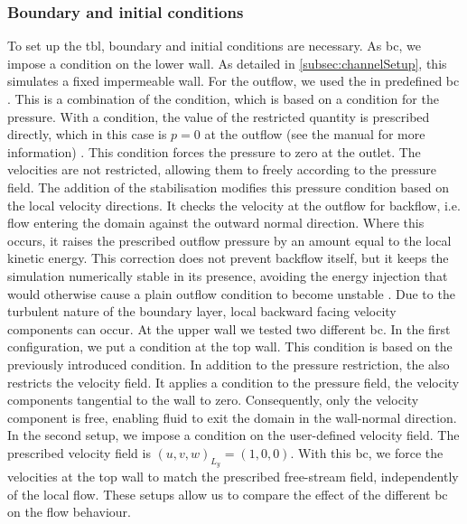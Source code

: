 \subsubsection{Boundary and initial conditions} 

To set up the \acrshort{tbl}, boundary and initial conditions are necessary. 
As \acrshort{bc}, we impose a  condition on the lower wall.
As detailed in \autoref{subsec:channelSetup}, this simulates a fixed impermeable wall.
For the outflow, we used the in  predefined \acrshort{bc} .
This is a combination of the  condition, which is based on a  condition for the pressure.
With a  condition, the value of the restricted quantity is prescribed directly, which in this case is $p = 0$ at the outflow (see the   manual for more information) .
This condition forces the pressure to zero at the outlet. 
The velocities are not restricted,  allowing them to freely according to the pressure field.
The addition of the  stabilisation modifies this pressure condition based on the local velocity directions. 
It checks the velocity at the outflow for backflow, i.e. flow entering the domain against the outward normal direction. Where this occurs, it raises the prescribed outflow pressure by an amount equal to the local kinetic energy. 
This correction does not prevent backflow itself, but it keeps the simulation numerically stable in its presence, avoiding the energy injection that would otherwise cause a plain outflow condition to become unstable .
Due to the turbulent nature of the boundary layer, local backward facing velocity components can occur.
At the upper wall we tested two different \acrshort{bc}.
In the first configuration, we put a  condition at the top wall.
This condition is based on the previously introduced  condition.
In addition to the pressure restriction, the  also restricts the velocity field.
It applies a  condition to the pressure field,  the velocity components tangential to the wall to zero.
Consequently, only the  velocity component is free, enabling fluid  to exit the domain in the wall-normal direction.
In the second setup, we impose a  condition on the user-defined velocity field.
The prescribed velocity field is $(u, v, w)_{L_y} = (1, 0, 0)$.
With this \acrshort{bc}, we force the velocities at the top wall to match the prescribed free-stream field, independently of the local flow.
These setups allow us to compare the effect of the different \acrlong{bc} on the flow behaviour. 

